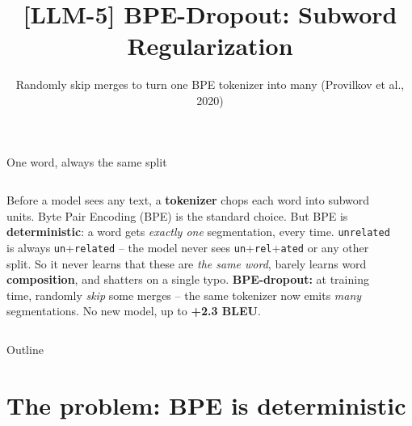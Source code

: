 \documentclass[aspectratio=169]{beamer}
\title{[LLM-5] BPE-Dropout: Subword Regularization}
\subtitle{Randomly skip merges to turn one BPE tokenizer into many (Provilkov et al., 2020)}
\date{}
\begin{document}
\begin{frame}{One word, always the same split}
  \begin{columns}[T]
    Before a model sees any text, a \textbf{tokenizer} chops each word into subword units.
    Byte Pair Encoding (BPE) is the standard choice.
    \vskip 6pt
    But BPE is \textbf{deterministic}: a word gets \emph{exactly one} segmentation, every
    time. \texttt{unrelated} is always \texttt{un}+\texttt{related} -- the model never sees
    \texttt{un}+\texttt{rel}+\texttt{ated} or any other split.
    \vskip 6pt
    So it never learns that these are \emph{the same word}, barely learns word
    \textbf{composition}, and shatters on a single typo.
    \vskip 8pt
    \textbf{BPE-dropout:} at training time, randomly \emph{skip} some merges -- the same
    tokenizer now emits \emph{many} segmentations. No new model, up to \textbf{+2.3 BLEU}.
    \begin{center}
    \end{center}
  \end{columns}
\end{frame}

\begin{frame}{Outline}
  \tableofcontents
\end{frame}

\section{The problem: BPE is deterministic}
\end{document}

